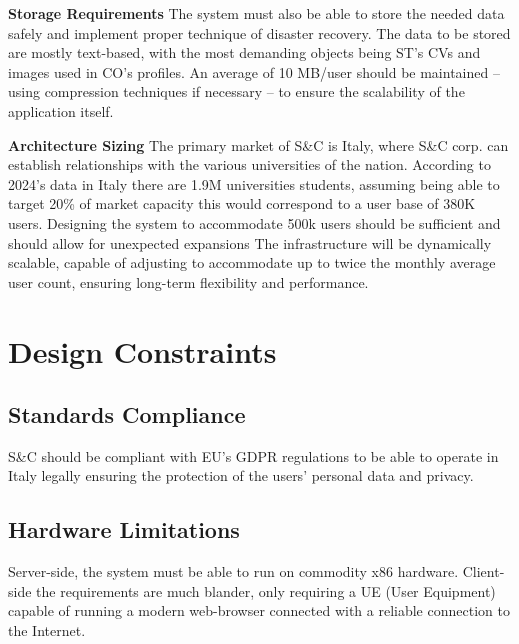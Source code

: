 \par{\textbf{Storage Requirements}} The system must also be able to store the needed data safely and implement proper
technique of disaster recovery. The data to be stored are mostly text-based, with the most demanding objects being ST’s
CVs and images used in CO’s profiles. An average of 10 MB/user should be maintained – using compression techniques if
necessary – to ensure the scalability of the application itself.

\par{\textbf{Architecture Sizing}} The primary market of S\&C is Italy, where S\&C corp. can establish relationships
with the various universities of the nation. According to 2024’s data in Italy there are 1.9M universities students,
assuming being able to target 20\% of market capacity this would correspond to a user base of 380K users. Designing the
system to accommodate 500k users should be sufficient and should allow for unexpected expansions The infrastructure
will be dynamically scalable, capable of adjusting to accommodate up to twice the monthly average user count, ensuring
long-term flexibility and performance.

\section{Design Constraints}
\label{sec:design-constraints}%

\subsection{Standards Compliance}
\label{subsec:standards-compliance}%

\par S\&C should be compliant with EU’s GDPR regulations to be able to operate in Italy legally ensuring the protection
of the users’ personal data and privacy.

\subsection{Hardware Limitations}
\label{subsec:hardware-limitations}%

\par Server-side, the system must be able to run on commodity x86 hardware. Client-side the requirements are much
blander, only requiring a UE (User Equipment) capable of running a modern web-browser connected with a reliable
connection to the Internet.

\pagebreak

